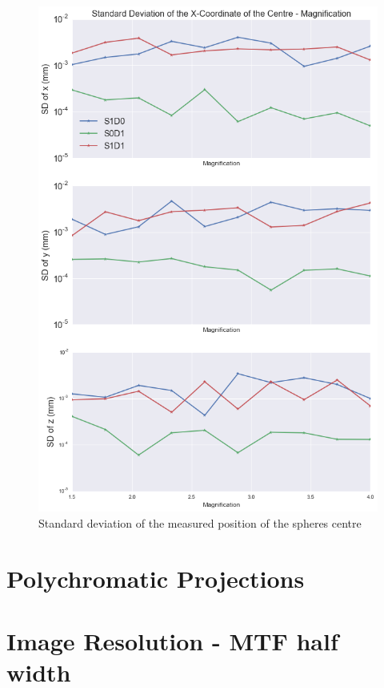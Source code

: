 \documentclass[
  twoside,
  11pt, a4paper,
  footinclude=true,
  headinclude=true,
  cleardoublepage=empty
]{scrbook}
\begin{document}
\begin{figure}[h!]
  \centering
    \includegraphics[width=\textwidth]{code/RadiusMeasurements/Plots_RadiusCentre_files/Plots_RadiusCentre_7_0.png}
    \caption{Standard deviation of the measured position of the spheres centre}
        \label{spherecentrevar}
\end{figure}

\section{Polychromatic Projections}

\section{Image Resolution - MTF half width}
\end{document}
